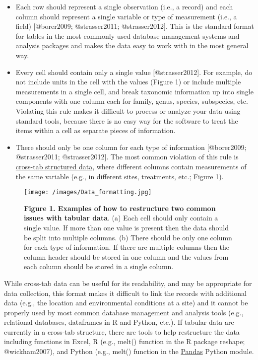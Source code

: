 \begin{itemize}
\itemsep1pt\parskip0pt
\item
  Each row should represent a single observation (i.e., a record) and
  each column should represent a single variable or type of measurement
  (i.e., a field) {[}@borer2009; @strasser2011; @strasser2012{]}. This
  is the standard format for tables in the most commonly used database
  management systems and analysis packages and makes the data easy to
  work with in the most general way.
\item
  Every cell should contain only a single value {[}@strasser2012{]}. For
  example, do not include units in the cell with the values (Figure 1)
  or include multiple measurements in a single cell, and break taxonomic
  information up into single components with one column each for family,
  genus, species, subspecies, etc. Violating this rule makes it
  difficult to process or analyze your data using standard tools,
  because there is no easy way for the software to treat the items
  within a cell as separate pieces of information.
\item
  There should only be one column for each type of information
  {[}@borer2009; @strasser2011; @strasser2012{]}. The most common
  violation of this rule is
  \href{http://en.wikipedia.org/wiki/Cross_tabulation}{cross-tab
  structured data}, where different columns contain measurements of the
  same variable (e.g., in different sites, treatments, etc.; Figure 1).
\end{itemize}

\begin{figure}[htbp]
\centering
\texttt{[image: /images/Data\_formatting.jpg]}
\caption{\textbf{Figure 1. Examples of how to restructure two common
issues with tabular data}. (a) Each cell should only contain a single
value. If more than one value is present then the data should be split
into multiple columns. (b) There should be only one column for each type
of information. If there are multiple columns then the column header
should be stored in one column and the values from each column should be
stored in a single column.}
\end{figure}

While cross-tab data can be useful for its readability, and may be
appropriate for data collection, this format makes it difficult to link
the records with additional data (e.g., the location and environmental
conditions at a site) and it cannot be properly used by most common
database management and analysis tools (e.g., relational databases,
dataframes in R and Python, etc.). If tabular data are currently in a
cross-tab structure, there are tools to help restructure the data
including functions in Excel, R (e.g., melt() function in the R package
reshape; @wickham2007), and Python (e.g., melt() function in the
\href{http://pandas.pydata.org/}{Pandas} Python module.

